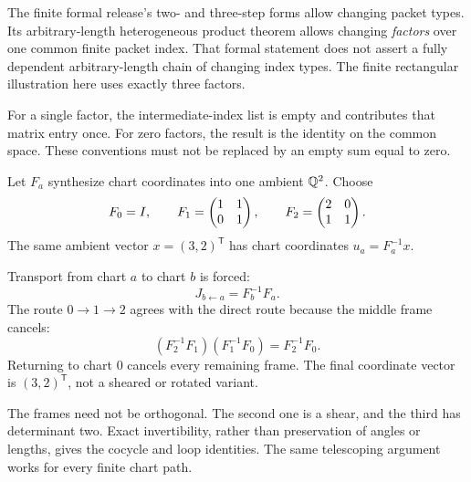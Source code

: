 The finite formal release's two- and three-step forms allow changing packet types. Its arbitrary-length heterogeneous product theorem allows changing \emph{factors} over one common finite packet index. That formal statement does not assert a fully dependent arbitrary-length chain of changing index types. The finite rectangular illustration here uses exactly three factors.

For a single factor, the intermediate-index list is empty and contributes that matrix entry once. For zero factors, the result is the identity on the common space. These conventions must not be replaced by an empty sum equal to zero.


Let $F_a$ synthesize chart coordinates into one ambient $\mathbb Q^2$. Choose
\[
F_0=I,\qquad F_1=\begin{pmatrix}1&1\\0&1\end{pmatrix},\qquad
F_2=\begin{pmatrix}2&0\\1&1\end{pmatrix}.
\]
The same ambient vector $x=(3,2)^\mathsf T$ has chart coordinates $u_a=F_a^{-1}x$.


Transport from chart $a$ to chart $b$ is forced:
\[
J_{b\leftarrow a}=F_b^{-1}F_a.
\]
The route $0\to1\to2$ agrees with the direct route because the middle frame cancels:
\[
(F_2^{-1}F_1)(F_1^{-1}F_0)=F_2^{-1}F_0.
\]
Returning to chart $0$ cancels every remaining frame. The final coordinate vector is $(3,2)^\mathsf T$, not a sheared or rotated variant.

The frames need not be orthogonal. The second one is a shear, and the third has determinant two. Exact invertibility, rather than preservation of angles or lengths, gives the cocycle and loop identities. The same telescoping argument works for every finite chart path.


